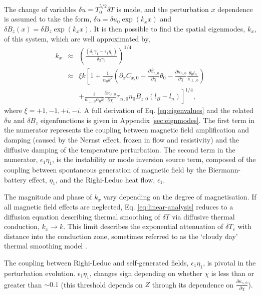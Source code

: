 \documentclass[aip,reprint]{revtex4-1}
\begin{document}
 The change of variables $\delta u= T_0^{5/2}\delta T$ is made, and the perturbation $x$ dependence is assumed to take the form, $\delta u = \delta u_0 \exp(k_x x)$ and $\delta B_z(x) = \delta B_z \exp(k_x x)$.  It is then possible to find the spatial eigenmodes, $k_x$, of this system, which are well approximated by,
\begin{eqnarray}
k_x &\approx& \left(\frac{(\delta_1 \gamma_1 - \epsilon_1 \eta_1)}{\delta_2 \gamma_3}\right)^{1/4} \nonumber\\
&\approx& \xi k \left[ 1 + \frac{1}{\alpha_0 k^2}\left(\partial_x C_{x,0} - \frac{\partial \beta_{\wedge,0}}{\partial \chi} \theta_0  -\frac{\partial \kappa_{\wedge,0}}{\partial \chi}  \frac{\theta_0 l_n}{ \kappa_{\perp,0}} \right)\right.  \nonumber\\
&  & \left. +\frac{i}{\kappa_{\perp,0}\alpha_{0} k}  \frac{\partial \kappa_{\wedge,0}}{\partial \chi} \tau_{ei,0} n_0 B_{z,0}\left( l_B - l_n \right) \right]^{1/4},
\label{eq:eigenvalues}
\end{eqnarray}
where $\xi = +1, -1, +i, -i$. A full derivation of Eq. \ref{eq:eigenvalues} and the related $\delta u$ and $\delta B_z$ eigenfunctions is given in Appendix \ref{sec:eignmodes}. The first term in the numerator represents the coupling between magnetic field amplification and damping (caused by the  Nernst effect, frozen in flow and resistivity) and the diffusive damping of the temperature perturbation. The second term in the numerator, $\epsilon_1 \eta_1$,  is the instability or mode inversion source term, composed of the coupling between spontaneous generation of magnetic field by the Biermann-battery effect, $\eta_1$, and the Righi-Leduc heat flow, $\epsilon_1$. 


The magnitude and phase of $k_x$ vary depending on the degree of magnetisation. 
If all magnetic field effects are neglected, Eq. \ref{eq:linear-analysis} reduces to a diffusion equation describing thermal smoothing of $\delta T$ via diffusive thermal conduction, $k_x \rightarrow k$. This limit describes the exponential attenuation of $\delta T_e$ with distance into the conduction zone, sometimes referred to as the `cloudy day' thermal smoothing model  \cite{Nuckolls1972,Goncharov2006}. 

The coupling between Righi-Leduc and self-generated fields, $\epsilon_1 \eta_1 $, is pivotal in the perturbation evolution. $\epsilon_1 \eta_1$, changes sign depending on whether $\chi$ is less than or greater than $\sim 0.1$ (this threshold depends on $Z$ through its dependence  on $\frac{\partial \kappa_{\wedge,0}}{\partial \chi}$). 
\end{document}
